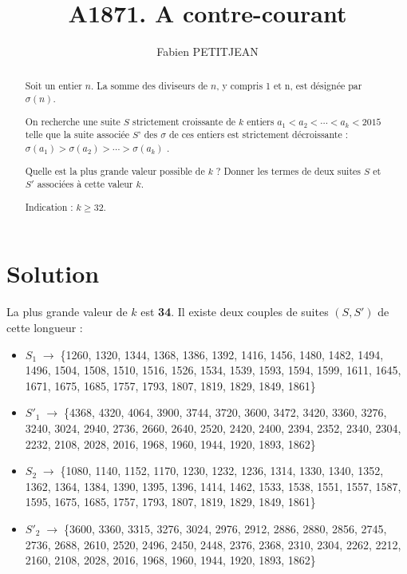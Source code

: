 \documentclass[10pt,a4paper,twocolumn]{article}
\author{Fabien PETITJEAN}
\title{A1871. A contre-courant}
\begin{document}
\maketitle
\begin{abstract}
Soit un entier $n$. La somme des diviseurs de $n$, y compris 1 et n, est désignée par $\sigma(n)$.

On recherche une suite $S$ strictement croissante de $k$ entiers $a_1 < a_2 < \cdots < a_k < 2015$ telle que la suite associée $S’$ des $\sigma$ de ces entiers est strictement décroissante : $\sigma(a_1) > \sigma(a_2) > \cdots >\sigma(a_k)$ .

Quelle est la plus grande valeur possible de $k$ ? Donner les termes de deux suites $S$ et $S'$ associées à cette valeur $k$.

Indication : $k \geq 32$.
\end{abstract}

\section{Solution}

La plus grande valeur de $k$ est {\bf 34}. Il existe deux couples de suites $(S, S')$ de cette longueur :
\begin{itemize}
\item $S_1 \;\rightarrow\;$\{1260, 1320, 1344, 1368, 1386, 1392, 1416, 1456, 1480, 1482, 1494, 1496, 1504, 1508, 1510, 1516, 1526, 1534, 1539, 1593, 1594, 1599, 1611, 1645, 1671, 1675, 1685, 1757, 1793, 1807, 1819, 1829, 1849, 1861\}
\item $S'_1 \;\rightarrow\;$\{4368, 4320, 4064, 3900, 3744, 3720, 3600, 3472, 3420, 3360, 3276, 3240, 3024, 2940, 2736, 2660, 2640, 2520, 2420, 2400, 2394, 2352, 2340, 2304, 2232, 2108, 2028, 2016, 1968, 1960, 1944, 1920, 1893, 1862\}
\end{itemize}

\begin{itemize}
\item $S_2 \;\rightarrow\;$\{1080, 1140, 1152, 1170, 1230, 1232, 1236, 1314, 1330, 1340, 1352, 1362, 1364, 1384, 1390, 1395, 1396, 1414, 1462, 1533, 1538, 1551, 1557, 1587, 1595, 1675, 1685, 1757, 1793, 1807, 1819, 1829, 1849, 1861\}
\item $S'_2 \;\rightarrow\;$\{3600, 3360, 3315, 3276, 3024, 2976, 2912, 2886, 2880, 2856, 2745, 2736, 2688, 2610, 2520, 2496, 2450, 2448, 2376, 2368, 2310, 2304, 2262, 2212, 2160, 2108, 2028, 2016, 1968, 1960, 1944, 1920, 1893, 1862\}
\end{itemize}
\end{document}
